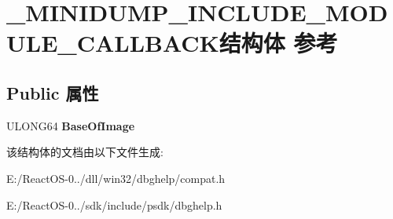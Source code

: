 \hypertarget{struct___m_i_n_i_d_u_m_p___i_n_c_l_u_d_e___m_o_d_u_l_e___c_a_l_l_b_a_c_k}{}\section{\+\_\+\+M\+I\+N\+I\+D\+U\+M\+P\+\_\+\+I\+N\+C\+L\+U\+D\+E\+\_\+\+M\+O\+D\+U\+L\+E\+\_\+\+C\+A\+L\+L\+B\+A\+C\+K结构体 参考}
\label{struct___m_i_n_i_d_u_m_p___i_n_c_l_u_d_e___m_o_d_u_l_e___c_a_l_l_b_a_c_k}
\subsection*{Public 属性}
\begin{DoxyCompactItemize}
\item 
\mbox{\label{struct___m_i_n_i_d_u_m_p___i_n_c_l_u_d_e___m_o_d_u_l_e___c_a_l_l_b_a_c_k_acef518ae037ce102947d6557b69a1926}} 
U\+L\+O\+N\+G64 {\bfseries Base\+Of\+Image}
\end{DoxyCompactItemize}


该结构体的文档由以下文件生成\+:\begin{DoxyCompactItemize}
\item 
E\+:/\+React\+O\+S-\/0../dll/win32/dbghelp/compat.\+h\item 
E\+:/\+React\+O\+S-\/0../sdk/include/psdk/dbghelp.\+h\end{DoxyCompactItemize}
